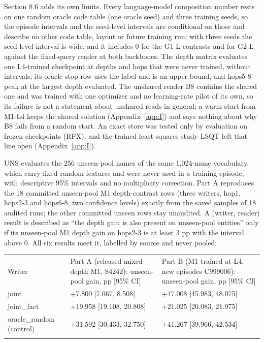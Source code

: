 Section 8.6 adds its own limits. Every language-model composition number rests on one random oracle code table (one oracle seed) and three training seeds, so the
episode intervals and the seed-level intervals are conditional on those and describe no other code table, layout or future training run; with three seeds the
seed-level interval is wide, and it includes 0 for the G1-L contrasts and for G2-L against the fixed-query reader at both backbones. The depth matrix  %
evaluates one L4-trained checkpoint at depths and hops that were never trained, without intervals; its oracle-stop row uses the label and is an upper bound, and
hops5-8 peak at the largest depth evaluated. The unshared reader B8 contains the shared one and was trained with one optimizer and no learning-rate pilot of  %
its own, so its failure is not a statement about unshared reads in general; a warm start from M1-L4 keeps the shared solution (Appendix~\ref{app:I}) and  %
says nothing about why B8 fails from a random start. An exact store was tested only by  %
evaluation on frozen checkpoints (RFX), and the trained least-squares study LSQT left that line open (Appendix~\ref{app:I}).  %

UNS evaluates the 256 unseen-pool names of the same 1,024-name vocabulary, which carry fixed
random features and were never used in a training episode, with descriptive 95\% intervals and no
multiplicity correction. Part A reproduces the 18 committed unseen-pool M1 depth-contrast rows
(three writers, hop1, hops2-3 and hops6-8, two confidence levels) exactly from the saved
samples of 18 audited runs; the other committed unseen rows stay unaudited. A  %
(writer, reader) result is described as “the depth gain is also present on unseen-pool entities”
only if its unseen-pool M1 depth gain on hops2-3 is at least 3 pp with the interval above 0. All
six results meet it, labelled by source and never pooled:


{\small
\setlength{\tabcolsep}{3pt}
\begin{longtable}{W{145}{6}W{411}{6}W{444}{6}}
\toprule
Writer & Part A (released mixed-depth M1, S4242): unseen-pool gain, pp [95\% CI] & Part B (M1 trained at L4, new episodes C999006): unseen-pool gain, pp [95\% CI] \\ \addlinespace[3pt]
\midrule \endhead
joint & +7.800 [7.067, 8.508] & +47.008 [45.983, 48.075] \\ \addlinespace[3pt]  %
joint\_fact & +19.958 [19.108, 20.808] & +21.025 [20.083, 21.975] \\ \addlinespace[3pt]  %
oracle\_random (control) & +31.592 [30.433, 32.750] & +41.267 [39.966, 42.534] \\ \addlinespace[3pt]  %
\bottomrule
\end{longtable}
}


